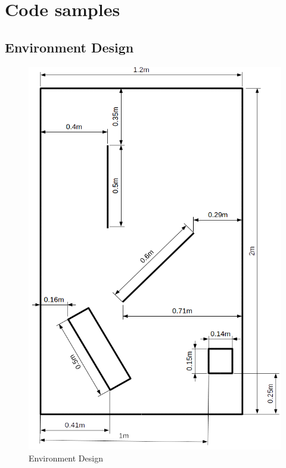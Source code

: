 \chapter{Code samples}

\section{Environment Design}
\begin{figure}[h]
\begin{center}
\includegraphics[scale=0.45]{Chapter1/images/environment.png} 
\caption{Environment Design}
\label{appendix2:environment}
\end{center}
\end{figure}
\newpage 

